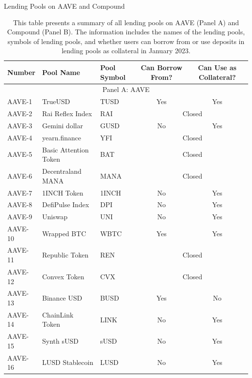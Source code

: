 \clearpage
\newpage

\clearpage
\newpage
    

\begin{table}[ht!]
\small 
\caption{Lending Pools on AAVE and Compound}\label{tabA:lendingpools}
\caption*{This table presents a summary of all lending pools on AAVE (Panel A) and Compound (Panel B). The information includes the names of the lending pools, symbols of lending pools, and whether users can borrow from or use deposits in lending pools as collateral in January 2023.   }

\centering
\def\sym#1{\ifmmode^{#1}\else\(^{#1}\)\fi}

\begin{tabular*}{\linewidth}{@{\extracolsep{\fill}}lllcc}
    \toprule
    Number & Pool Name & Pool Symbol & Can Borrow From? & Can Use as Collateral? \\
    \midrule
    \multicolumn{5}{c}{Panel A: AAVE} \\
    \midrule
    AAVE-1 & TrueUSD & TUSD  & Yes   & Yes \\
    AAVE-2 & Rai Reflex Index & RAI   & \multicolumn{2}{c}{Closed} \\
    AAVE-3 & Gemini dollar & GUSD  & No    & Yes \\
    AAVE-4 & yearn.finance & YFI   & \multicolumn{2}{c}{Closed} \\
    AAVE-5 & Basic Attention Token & BAT   & \multicolumn{2}{c}{Closed} \\
    AAVE-6 & Decentraland MANA & MANA  & \multicolumn{2}{c}{Closed} \\
    AAVE-7 & 1INCH Token & 1INCH & No    & Yes \\
    AAVE-8 & DefiPulse Index & DPI   & No    & Yes \\
    AAVE-9 & Uniswap & UNI   & No    & Yes \\
    AAVE-10 & Wrapped BTC & WBTC  & Yes   & Yes \\
    AAVE-11 & Republic Token & REN   & \multicolumn{2}{c}{Closed} \\
    AAVE-12 & Convex Token & CVX   & \multicolumn{2}{c}{Closed} \\
    AAVE-13 & Binance USD & BUSD  & Yes   & No \\
    AAVE-14 & ChainLink Token & LINK  & No    & Yes \\
    AAVE-15 & Synth sUSD & sUSD  & No    & Yes \\
    AAVE-16 & LUSD Stablecoin & LUSD  & No    & Yes \\

\end{tabular*}
\end{table}
